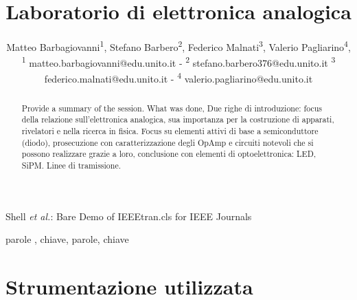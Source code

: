 \documentclass[journal]{IEEEtran}
\begin{document}
\title{Laboratorio di elettronica analogica\\ 
}

\author{\begin{center}Matteo Barbagiovanni\textsuperscript{1},
        Stefano Barbero\textsuperscript{2},
        Federico Malnati\textsuperscript{3},
        Valerio Pagliarino\textsuperscript{4},
        {\small \\
        \textsuperscript{1}
        matteo.barbagiovanni@edu.unito.it -
        \textsuperscript{2}
        stefano.barbero376@edu.unito.it
        \textsuperscript{3}
        federico.malnati@edu.unito.it -
        \textsuperscript{4}
        valerio.pagliarino@edu.unito.it}
        \end{center}}%
        
{Shell \MakeLowercase{\textit{et al.}}: Bare Demo of IEEEtran.cls for IEEE Journals}

\maketitle

\begin{abstract} Provide a summary of the session. What was done, 
Due righe di introduzione: focus della relazione sull'elettronica analogica, sua importanza per la costruzione di apparati, rivelatori e nella ricerca in fisica. Focus su elementi attivi di base a semiconduttore (diodo), prosecuzione con caratterizzazione degli OpAmp e circuiti notevoli che si possono realizzare grazie a loro, conclusione con elementi di optoelettronica: LED, SiPM. Linee di tramissione.
\end{abstract}

\begin{IEEEkeywords}
parole , chiave, parole, chiave
\end{IEEEkeywords}

\section{Strumentazione utilizzata}
\end{document}

